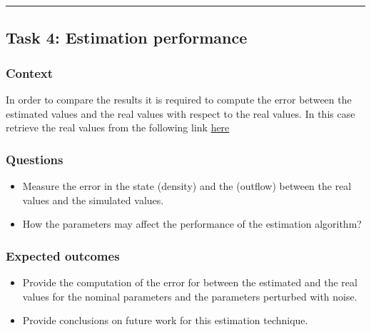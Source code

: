 \documentclass[]{book}
\providecommand{\tightlist}{%
  \setlength{\itemsep}{0pt}\setlength{\parskip}{0pt}}
\theoremstyle{definition}
\theoremstyle{definition}
\theoremstyle{definition}
\theoremstyle{remark}
\begin{document}
\begin{center}\rule{0.5\linewidth}{\linethickness}\end{center}

\hypertarget{task-4-estimation-performance}{%
\subsection*{Task 4: Estimation
performance}\label{task-4-estimation-performance}}

\hypertarget{context-12}{%
\subsubsection*{Context}\label{context-12}}

In order to compare the results it is required to compute the error
between the estimated values and the real values with respect to the
real values. In this case retrieve the real values from the following
link
\href{https://github.com/aladinoster/density-reconstruction/blob/master/Osc_4x4.mat}{here}

\hypertarget{questions-11}{%
\subsubsection*{Questions}\label{questions-11}}

\begin{itemize}
\tightlist
\item
  Measure the error in the state (density) and the (outflow) between the
  real values and the simulated values.
\item
  How the parameters may affect the performance of the estimation
  algorithm?
\end{itemize}

\hypertarget{expected-outcomes-11}{%
\subsubsection*{Expected outcomes}\label{expected-outcomes-11}}

\begin{itemize}
\tightlist
\item
  Provide the computation of the error for between the estimated and the
  real values for the nominal parameters and the parameters perturbed
  with noise.
\item
  Provide conclusions on future work for this estimation technique.
\end{itemize}
\end{document}
